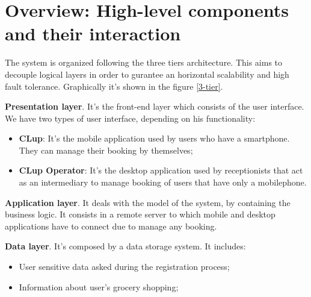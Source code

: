 \section{Overview: High-level components and their interaction}
The system is organized following the three tiers architecture. This aims to decouple logical layers in order to gurantee an horizontal scalability and high fault tolerance.
Graphically it's shown in the figure \ref{3-tier}.
\par

\textbf{Presentation layer}. It's the front-end layer which consists of the user interface. We have two types of user interface, depending on his functionality: 
\begin{itemize}
\item \textbf{CLup}: It's the mobile application used by users who have a smartphone. They can manage their booking by themselves;
\item \textbf{CLup Operator}: It's the desktop application used by receptionists that act as an intermediary to manage booking of users that have only a mobilephone.
\end{itemize}

\textbf{Application layer}. It deals with the model of the system, by containing the business logic. It consists in a remote server to which mobile and desktop applications have to connect due to manage any booking.

\textbf{Data layer}. It's composed by a data storage system. It includes: 


\begin{itemize}
\item User sensitive data asked during the registration process;
\item Information about user's grocery shopping;
\end{itemize}

